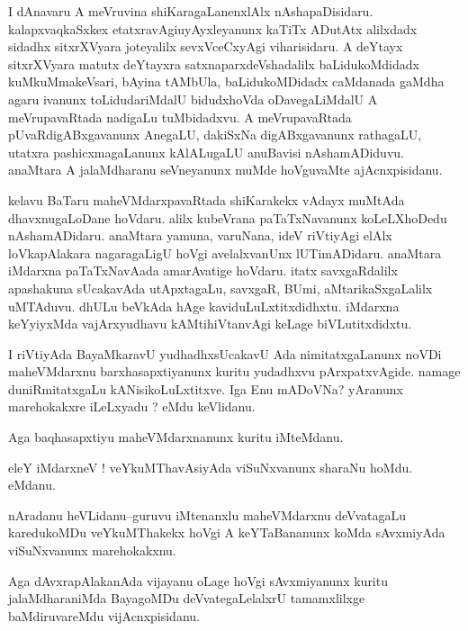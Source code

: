 \documentclass{article}
\begin{document}
\begin{mn}%
I dAnavaru A meVruvina shiKaragaLanenxlAlx nAshapaDisidaru. kalapxvaqkaSxkex 
etatxravAgiuyAyxleyanunx kaTiTx ADutAtx alilxdadx sidadhx sitxrXVyara joteyalilx 
sevxVceCxyAgi viharisidaru. A deYtayx sitxrXVyara matutx deYtayxra satxnaparxdeVshadalilx 
baLidukoMdidadx kuMkuMmakeVsari, bAyina tAMbUla, baLidukoMDidadx caMdanada gaMdha agaru 
ivanunx toLidudariMdalU bidudxhoVda oDavegaLiMdalU A meVrupavaRtada nadigaLu tuMbidadxvu. A 
meVrupavaRtada pUvaRdigABxgavanunx AnegaLU, dakiSxNa digABxgavanunx rathagaLU, utatxra 
pashicxmagaLanunx kAlALugaLU anuBavisi nAshamADiduvu. anaMtara A jalaMdharanu seVneyanunx 
muMde hoVguvaMte ajAcnxpisidanu.
\end{mn}

\begin{mn}%
kelavu BaTaru maheVMdarxpavaRtada shiKarakekx vAdayx muMtAda dhavxnugaLoDane hoVdaru. alilx 
kubeVrana paTaTxNavanunx koLeLXhoDedu nAshamADidaru. anaMtara yamuna, varuNana, ideV 
riVtiyAgi elAlx loVkapAlakara nagaragaLigU hoVgi avelalxvanUnx lUTimADidaru. anaMtara 
iMdarxna paTaTxNavAada amarAvatige hoVdaru. itatx savxgaRdalilx apashakuna sUcakavAda 
utApxtagaLu, savxgaR, BUmi, aMtarikaSxgaLalilx uMTAduvu. dhULu beVkAda hAge 
kaviduLuLxtitxdidhxtu. iMdarxna keYyiyxMda vajArxyudhavu kAMtihiVtanvAgi keLage 
biVLutitxdidxtu.
\end{mn}

\begin{mn}%
I riVtiyAda BayaMkaravU yudhadhxsUcakavU Ada nimitatxgaLanunx noVDi maheVMdarxnu 
barxhasapxtiyanunx kuritu yudadhxvu pArxpatxvAgide. namage duniRmitatxgaLu 
kANisikoLuLxtitxve. Iga Enu mADoVNa? yAranunx marehokakxre iLeLxyadu ? eMdu keVlidanu.
\end{mn}

\begin{mn}%
Aga baqhasapxtiyu maheVMdarxnanunx kuritu iMteMdanu.
\end{mn}

\begin{mn}%
eleY iMdarxneV ! veYkuMThavAsiyAda viSuNxvanunx sharaNu hoMdu. eMdanu.
\end{mn}

\begin{mn}%
nAradanu heVLidanu--guruvu iMtenanxlu maheVMdarxnu deVvatagaLu karedukoMDu veYkuMThakekx hoVgi
A keYTaBananunx koMda sAvxmiyAda viSuNxvanunx marehokakxnu.
\end{mn}

\begin{mn}%
Aga dAvxrapAlakanAda vijayanu oLage hoVgi sAvxmiyanunx kuritu jalaMdharaniMda BayagoMDu 
deVvategaLelalxrU tamamxlilxge baMdiruvareMdu vijAcnxpisidanu.
\end{mn}
\end{document}
